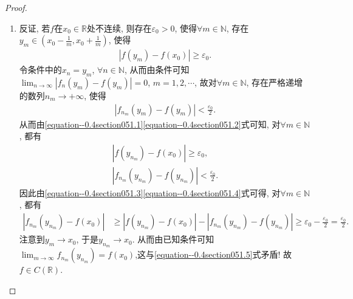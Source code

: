 \documentclass[../../main.tex]{subfiles}%
\begin{document}
\begin{proof}
\begin{enumerate}
\item 反证, 若\(f\)在\(x_0\in \mathbb{R}\)处不连续, 则存在\(\varepsilon_0 > 0\), 使得\(\forall m\in \mathbb{N}\), 存在\(y_m\in (x_0 - \frac{1}{m}, x_0 + \frac{1}{m})\), 使得
\begin{align}
|f(y_m) - f(x_0)| \geqslant \varepsilon_0. \label{equation--0.4section051.1}
\end{align}
令条件中的\(x_n= y_m\), \(\forall n\in \mathbb{N}\), 从而由条件可知\(\lim_{n\rightarrow \infty}|f_n(y_m) - f(y_m)| = 0\), \(m = 1,2,\cdots\),
故对\(\forall m\in \mathbb{N}\), 存在严格递增的数列\(n_m\rightarrow +\infty\), 使得
\begin{align}
|f_{n_m}(y_m) - f(y_m)| < \frac{\varepsilon_0}{2}. \label{equation--0.4section051.2}
\end{align}
从而由\eqref{equation--0.4section051.1}\eqref{equation--0.4section051.2}式可知, 对\(\forall m\in \mathbb{N}\), 都有
\begin{gather}
|f(y_{n_m}) - f(x_0)| \geqslant \varepsilon_0, \label{equation--0.4section051.3}\\
|f_{n_m}(y_{n_m}) - f(y_{n_m})| < \frac{\varepsilon_0}{2}. \label{equation--0.4section051.4}
\end{gather}
因此由\eqref{equation--0.4section051.3}\eqref{equation--0.4section051.4}式可得, 对\(\forall m\in \mathbb{N}\), 都有
\begin{align}
|f_{n_m}(y_{n_m}) - f(x_0)| &\geqslant |f(y_{n_m}) - f(x_0)| - |f_{n_m}(y_{n_m}) - f(y_{n_m})| \geqslant \varepsilon_0 - \frac{\varepsilon_0}{2} = \frac{\varepsilon_0}{2}. \label{equation--0.4section051.5}
\end{align}
注意到\(y_m\rightarrow x_0\), 于是\(y_{n_m}\rightarrow x_0\). 从而由已知条件可知\(\lim_{m\rightarrow \infty}f_{n_m}(y_{n_m}) = f(x_0)\),这与\eqref{equation--0.4section051.5}式矛盾! 故\(f\in C(\mathbb{R})\). 
\end{enumerate}
\end{proof}
\end{document}

